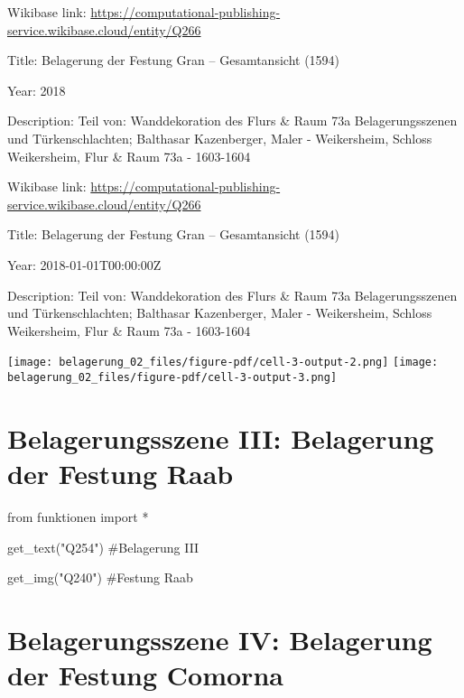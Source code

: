 \documentclass[
  a4paper,
  portrait]{book}
\newenvironment{Shaded}{\begin{snugshade}}{\end{snugshade}}
\newcommand{\CommentTok}[1]{\textcolor[rgb]{0.37,0.37,0.37}{#1}}
\newcommand{\ImportTok}[1]{\textcolor[rgb]{0.00,0.46,0.62}{#1}}
\newcommand{\NormalTok}[1]{\textcolor[rgb]{0.00,0.23,0.31}{#1}}
\newcommand{\OperatorTok}[1]{\textcolor[rgb]{0.37,0.37,0.37}{#1}}
\newcommand{\StringTok}[1]{\textcolor[rgb]{0.13,0.47,0.30}{#1}}
\begin{document}
Wikibase link:
\url{https://computational-publishing-service.wikibase.cloud/entity/Q266}

Title: Belagerung der Festung Gran -- Gesamtansicht (1594)

Year: 2018

Description: Teil von: Wanddekoration des Flurs \& Raum 73a
Belagerungsszenen und Türkenschlachten; Balthasar Kazenberger, Maler -
Weikersheim, Schloss Weikersheim, Flur \& Raum 73a - 1603-1604

Wikibase link:
\url{https://computational-publishing-service.wikibase.cloud/entity/Q266}

Title: Belagerung der Festung Gran -- Gesamtansicht (1594)

Year: 2018-01-01T00:00:00Z

Description: Teil von: Wanddekoration des Flurs \& Raum 73a
Belagerungsszenen und Türkenschlachten; Balthasar Kazenberger, Maler -
Weikersheim, Schloss Weikersheim, Flur \& Raum 73a - 1603-1604

\texttt{[image: belagerung\_02\_files/figure-pdf/cell-3-output-2.png]}
\texttt{[image: belagerung\_02\_files/figure-pdf/cell-3-output-3.png]}

\chapter{Belagerungsszene III: Belagerung der Festung
Raab}\label{belagerungsszene-iii-belagerung-der-festung-raab}

\begin{Shaded}
\begin{Highlighting}[]
\ImportTok{from}\NormalTok{ funktionen }\ImportTok{import} \OperatorTok{*}
\end{Highlighting}
\end{Shaded}

\begin{Shaded}
\begin{Highlighting}[]
\NormalTok{get\_text(}\StringTok{"Q254"}\NormalTok{)}
\CommentTok{\#Belagerung III}

\NormalTok{get\_img(}\StringTok{"Q240"}\NormalTok{)}
\CommentTok{\#Festung Raab}
\end{Highlighting}
\end{Shaded}

\chapter{Belagerungsszene IV: Belagerung der Festung
Comorna}\label{belagerungsszene-iv-belagerung-der-festung-comorna}
\end{document}
